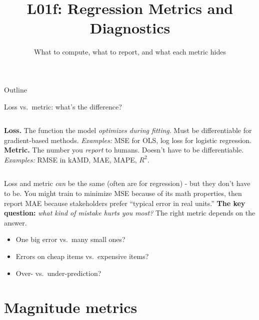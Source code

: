 \documentclass[aspectratio=169]{beamer}
\title{L01f: Regression Metrics and Diagnostics}
\subtitle{What to compute, what to report, and what each metric hides}
\date{}
\begin{document}
\begin{frame}{Outline}
  \tableofcontents
\end{frame}

\begin{frame}{Loss vs.\ metric: what's the difference?}
  \begin{columns}[T]
    \textbf{Loss.} The function the model \emph{optimizes during fitting}. Must be differentiable for gradient-based methods.
    \vskip 4pt
    \emph{Examples:} MSE for OLS, log loss for logistic regression.
    \textbf{Metric.} The number you \emph{report} to humans. Doesn't have to be differentiable.
    \vskip 4pt
    \emph{Examples:} RMSE in kAMD, MAE, MAPE, $R^2$.
  \end{columns}
  \vfill
  Loss and metric \emph{can} be the same (often are for regression) - but they don't have to be. You might train to minimize MSE because of its math properties, then report MAE because stakeholders prefer ``typical error in real units.''
  \vfill
  \textbf{The key question:} \emph{what kind of mistake hurts you most?} The right metric depends on the answer.
  \vfill
  \begin{itemize}\small
    \item One big error vs.\ many small ones?
    \item Errors on cheap items vs.\ expensive items?
    \item Over- vs.\ under-prediction?
  \end{itemize}
\end{frame}

\section{Magnitude metrics}
\end{document}

